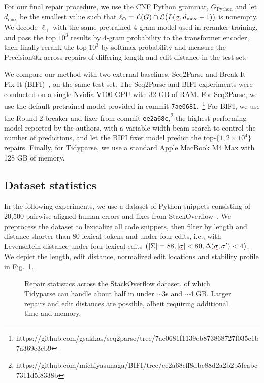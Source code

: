 \documentclass[sigplan,review,acmsmall,nonacm,screen,anonymous]{acmart}\settopmatter{printfolios=false,printccs=false,printacmref=false}
\begin{document}
For our final repair procedure, we use the CNF Python grammar, $G_{\text{Python}}$ and let $d_{\max}$ be the smallest value such that $\ell_\cap = \mathcal{L}(G)\cap\mathcal{L}\big(L(\err\sigma, d_{\max} - 1)\big)$ is nonempty. We decode $\ell_\cap$ with the same pretrained $4$-gram model used in reranker training, and pass the top $10^3$ results by 4-gram probability to the transformer encoder, then finally rerank the top $10^3$ by softmax probability and measure the Precision@k across repairs of differing length and edit distance in the test set.

We compare our method with two external baselines, Seq2Parse and Break-It-Fix-It (BIFI)~\cite{yasunaga2021break}, on the same test set. The Seq2Parse and BIFI experiments were conducted on a single Nvidia V100 GPU with 32 GB of RAM. For Seq2Parse, we use the default pretrained model provided in commit \texttt{7ae0681}.~\footnote{https://github.com/gsakkas/seq2parse/tree/7ae0681f1139cb873868727f035c1b7a369c3eb9} For BIFI, we use the Round 2 breaker and fixer from commit \texttt{ee2a68c},\footnote{https://github.com/michiyasunaga/BIFI/tree/ee2a68cff8dbe88d2a2b2b5feabc7311d5f8338b} the highest-performing model reported by the authors, with a variable-width beam search to control the number of predictions, and let the BIFI fixer model predict the top-$\{1, 2\times 10^4\}$ repairs. Finally, for Tidyparse, we use a standard Apple MacBook M4 Max with 128 GB of memory.

\clearpage\subsection{Dataset statistics}\label{sec:rq1}

In the following experiments, we use a dataset of Python snippets consisting of 20,500 pairwise-aligned human errors and fixes from StackOverflow~\cite{wong2019syntax}. We preprocess the dataset to lexicalize all code snippets, then filter by length and distance shorter than 80 lexical tokens and under four edits, i.e., with Levenshtein distance under four lexical edits $\big(|\Sigma| = 88, |\err{\sigma}| < 80, \Delta(\err{\sigma}, \sigma') < 4\big)$. We depict the length, edit distance, normalized edit locations and stability profile in Fig.~\ref{fig:patch_stats}.\vspace{-0.2cm}

\begin{figure}[h!]

\vspace{-0.2cm}
\caption{Repair statistics across the StackOverflow dataset, of which Tidyparse can handle about half in under $\sim$3s and $\sim$4 GB. Larger repairs and edit distances are possible, albeit requiring additional time and memory.}\label{fig:patch_stats}\vspace{-0.2cm}
\end{figure}
\end{document}
